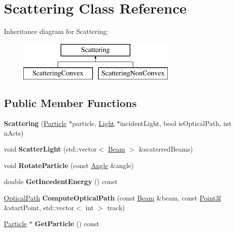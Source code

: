 \hypertarget{class_scattering}{}\section{Scattering Class Reference}
\label{class_scattering}
Inheritance diagram for Scattering\+:\begin{figure}[H]
\begin{center}
\leavevmode
\includegraphics[height=2.000000cm]{class_scattering}
\end{center}
\end{figure}
\subsection*{Public Member Functions}
\begin{DoxyCompactItemize}
\item 
\mbox{\label{class_scattering_ac71a8e1647ec322a7673a8d17d4bf771}} 
{\bfseries Scattering} (\mbox{\hyperlink{class_particle}{Particle}} $\ast$particle, \mbox{\hyperlink{class_light}{Light}} $\ast$incident\+Light, bool is\+Optical\+Path, int n\+Acts)
\item 
\mbox{\label{class_scattering_ab428bc4f6c26d02bcf7044e653cdf523}} 
void {\bfseries Scatter\+Light} (std\+::vector$<$ \mbox{\hyperlink{class_beam}{Beam}} $>$ \&scaterred\+Beams)
\item 
\mbox{\label{class_scattering_ad6e04f119afe24a685dcc3db8fc3831d}} 
void {\bfseries Rotate\+Particle} (const \mbox{\hyperlink{class_angle}{Angle}} \&angle)
\item 
\mbox{\label{class_scattering_a47ef76beb93ec117c2f10c7cf7f07152}} 
double {\bfseries Get\+Incedent\+Energy} () const
\item 
\mbox{\label{class_scattering_ac628a914ca4f93914df8cc3e64b03636}} 
\mbox{\hyperlink{struct_optical_path}{Optical\+Path}} {\bfseries Compute\+Optical\+Path} (const \mbox{\hyperlink{class_beam}{Beam}} \&beam, const \mbox{\hyperlink{struct_point3f}{Point3f}} \&start\+Point, std\+::vector$<$ int $>$ track)
\item 
\mbox{\label{class_scattering_ac099d494af981dc3577888f2878ddcc0}} 
\mbox{\hyperlink{class_particle}{Particle}} $\ast$ {\bfseries Get\+Particle} () const
\end{DoxyCompactItemize}
